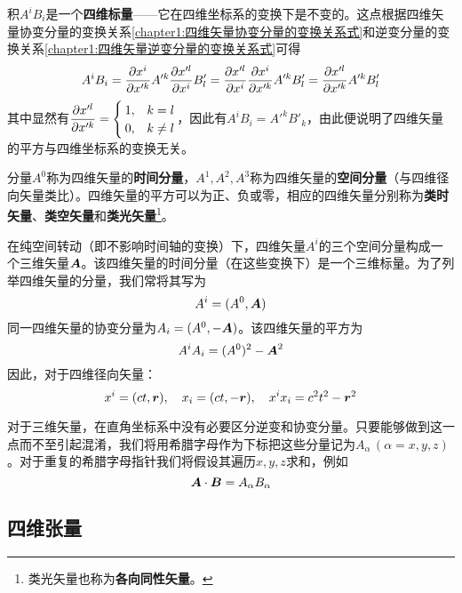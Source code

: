 积$A^iB_i$是一个{\bf 四维标量}——它在四维坐标系的变换下是不变的。这点根据四维矢量协变分量的变换关系\eqref{chapter1:四维矢量协变分量的变换关系式}和逆变分量的变换关系\eqref{chapter1:四维矢量逆变分量的变换关系式}可得
\begin{equation*}
	A^iB_i = \frac{\partial x^i}{\partial x'^k} A'^k \frac{\partial x'^l}{\partial x^i} B'_l = \frac{\partial x'^l}{\partial x^i} \frac{\partial x^i}{\partial x'^k} A'^k B'_l = \frac{\partial x'^l}{\partial x'^k} A'^kB'_l
\end{equation*}
其中显然有$\dfrac{\partial x'^l}{\partial x'^k} = \begin{cases} 1, & k=l \\ 0, & k\neq l \end{cases}$，因此有$A^iB_i = A'^kB'_k$，由此便说明了四维矢量的平方与四维坐标系的变换无关。

分量$A^0$称为四维矢量的{\bf 时间分量}，$A^1,A^2,A^3$称为四维矢量的{\bf 空间分量}（与四维径向矢量类比）。四维矢量的平方可以为正、负或零，相应的四维矢量分别称为{\bf 类时矢量}、{\bf 类空矢量}和{\bf 类光矢量}\footnote{类光矢量也称为{\bf 各向同性矢量}。}。

在纯空间转动（即不影响时间轴的变换）下，四维矢量$A^i$的三个空间分量构成一个三维矢量$\boldsymbol{A}$。该四维矢量的时间分量（在这些变换下）是一个三维标量。为了列举四维矢量的分量，我们常将其写为
\begin{equation*}
	A^i = (A^0,\boldsymbol{A})
\end{equation*}
同一四维矢量的协变分量为$A_i=(A^0,-\boldsymbol{A})$。该四维矢量的平方为
\begin{equation*}
	A^iA_i = (A^0)^2 - \boldsymbol{A}^2
\end{equation*}
因此，对于四维径向矢量：
\begin{equation*}
	x^i = (ct,\boldsymbol{r}),\quad x_i = (ct,-\boldsymbol{r}),\quad x^ix_i = c^2t^2- \boldsymbol{r}^2
\end{equation*}

对于三维矢量，在直角坐标系中没有必要区分逆变和协变分量。只要能够做到这一点而不至引起混淆，我们将用希腊字母作为下标把这些分量记为$A_\alpha\,(\alpha=x,y,z)$。对于重复的希腊字母指针我们将假设其遍历$x,y,z$求和，例如
\begin{equation*}
	\boldsymbol{A} \cdot \boldsymbol{B} = A_\alpha B_\alpha
\end{equation*}

\subsection{四维张量}

